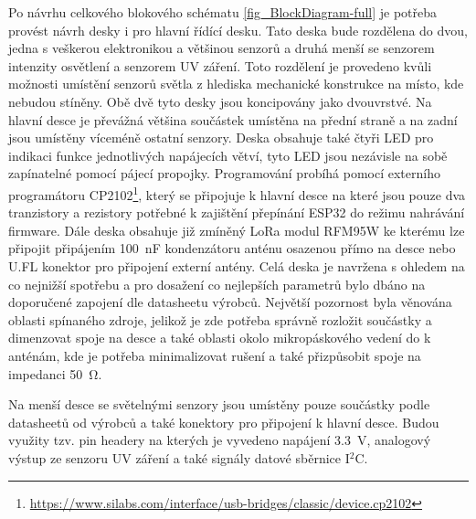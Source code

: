 Po návrhu celkového blokového schématu \ref{fig_BlockDiagram-full} je potřeba provést návrh desky i pro hlavní řídící desku. Tato deska bude rozdělena do dvou, jedna s veškerou elektronikou a většinou senzorů a druhá menší se senzorem intenzity osvětlení a senzorem UV záření. Toto rozdělení je provedeno kvůli možnosti umístění senzorů světla z hlediska mechanické konstrukce na místo, kde nebudou stíněny. Obě dvě tyto desky jsou koncipovány jako dvouvrstvé. Na hlavní desce je převážná většina součástek umístěna na přední straně a na zadní jsou umístěny víceméně ostatní senzory. Deska obsahuje také čtyři LED pro indikaci funkce jednotlivých napájecích větví, tyto LED jsou nezávisle na sobě zapínatelné pomocí pájecí propojky. Programování probíhá pomocí externího programátoru CP2102\footnote{\url{https://www.silabs.com/interface/usb-bridges/classic/device.cp2102}}, který se připojuje k hlavní desce na které jsou pouze dva tranzistory a rezistory potřebné k zajištění přepínání ESP32 do režimu nahrávání firmware. Dále deska obsahuje již zmíněný LoRa modul RFM95W ke kterému lze připojit připájením \SI{100}{\nano\farad} kondenzátoru anténu osazenou přímo na desce nebo U.FL konektor pro připojení externí antény. Celá deska je navržena s ohledem na co nejnižší spotřebu a pro dosažení co nejlepších parametrů bylo dbáno na doporučené zapojení dle datasheetu výrobců. Největší pozornost byla věnována oblasti spínaného zdroje, jelikož je zde potřeba správně rozložit součástky a dimenzovat spoje na desce a také oblasti okolo mikropáskového vedení do k anténám, kde je potřeba minimalizovat rušení a také přizpůsobit spoje na impedanci \SI{50}{\ohm}.

Na menší desce se světelnými senzory jsou umístěny pouze součástky podle datasheetů od výrobců a také konektory pro připojení k hlavní desce. Budou využity tzv. pin headery na kterých je vyvedeno napájení \SI{3.3}{\volt}, analogový výstup ze senzoru UV záření a také signály datové sběrnice I$^2$C.




